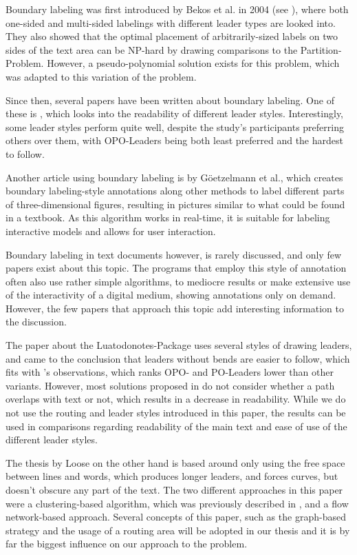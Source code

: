 \documentclass[11pt,a4paper]{vutinfth}
\begin{document}
Boundary labeling was first introduced by Bekos et al. in 2004 (see \cite{Bekos2005}), where both one-sided and multi-sided labelings with different leader types are looked into. They also showed that the optimal placement of arbitrarily-sized labels on two sides of the text area can be NP-hard by drawing comparisons to the Partition-Problem. However, a pseudo-polynomial solution exists for this problem, which was adapted to this variation of the problem.

Since then, several papers have been written about boundary labeling. One of these is \cite{Barth2015}, which looks into the readability of different leader styles. Interestingly, some leader styles perform quite well, despite the study's participants preferring others over them, with OPO-Leaders being both least preferred and the hardest to follow.

Another article using boundary labeling is \cite{Goetzelmann2006} by G{\"o}etzelmann et al., which creates boundary labeling-style annotations along other methods to label different parts of three-dimensional figures, resulting in pictures similar to what could be found in a textbook. As this algorithm works in real-time, it is suitable for labeling interactive models and allows for user interaction.


Boundary labeling in text documents however, is rarely discussed, and only few papers exist about this topic. The programs that employ this style of annotation often also use rather simple algorithms, to mediocre results or make extensive use of the interactivity of a digital medium, showing annotations only on demand. However, the few papers that approach this topic add interesting information to the discussion.

The paper about the Luatodonotes-Package\cite{Kindermann2014} uses several styles of drawing leaders, and came to the conclusion that leaders without bends are easier to follow, which fits with \cite{Barth2015}'s observations, which ranks OPO- and PO-Leaders lower than other variants.
However, most solutions proposed in \cite{Kindermann2014} do not consider whether a path overlaps with text or not, which results in a decrease in readability. While we do not use the routing and leader styles introduced in this paper, the results can be used in comparisons regarding readability of the main text and ease of use of the different leader styles.%

The thesis by Loose\cite{Loose2015} on the other hand is based around only using the free space between lines and words, which produces longer leaders, and forces curves, but doesn't obscure any part of the text. The two different approaches in this paper were a clustering-based algorithm, which was previously described in \cite{Nollenburg2010}, and a flow network-based approach. Several concepts of this paper, such as the graph-based strategy and the usage of a routing area will be adopted in our thesis and it is by far the biggest influence on our approach to the problem.  %
\end{document}
